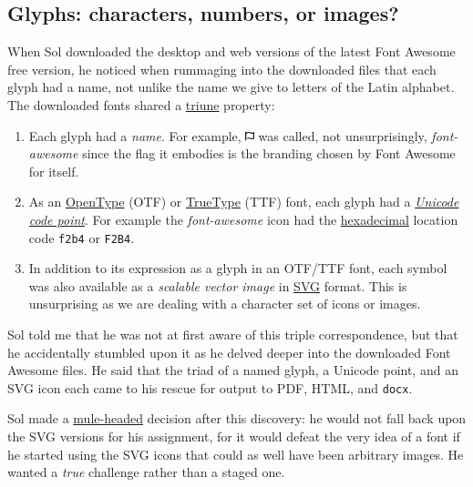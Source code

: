 \documentclass[
  british,
  a4paper,
  rgb,
  dvipsnames,
  svgnames,
  hyphens]{article}
\begin{document}
\hypertarget{glyphs-characters-numbers-or-images}{%
\subsection{Glyphs: characters, numbers, or
images?}\label{glyphs-characters-numbers-or-images}}

When Sol downloaded the desktop and web versions of the latest Font
Awesome free version, he noticed when rummaging into the downloaded
files that each glyph had a name, not unlike the name we give to letters
of the Latin alphabet. The downloaded fonts shared a
\href{https://www.collinsdictionary.com/dictionary/english/triune}{triune}
property:

\begin{enumerate}
\item
  Each glyph had a \emph{name}. For example,
  \includegraphics[width=0.02\textwidth,height=\textheight]{images/font-awesome.svg}
  was called, not unsurprisingly, \emph{font-awesome} since the flag it
  embodies is the branding chosen by Font Awesome for itself.
\item
  As an \href{https://en.wikipedia.org/wiki/OpenType}{OpenType} (OTF) or
  \href{https://en.wikipedia.org/wiki/TrueType}{TrueType} (TTF) font,
  each glyph had a
  \href{https://en.wikipedia.org/wiki/Code_point}{\emph{Unicode code
  point}}. For example the \emph{font-awesome} icon had the
  \href{https://en.wikipedia.org/wiki/Hexadecimal}{hexadecimal} location
  code \texttt{f2b4} or \texttt{F2B4}.
\item
  In addition to its expression as a glyph in an OTF/TTF font, each
  symbol was also available as a \emph{scalable vector image} in
  \href{https://developer.mozilla.org/en-US/docs/Web/SVG}{SVG} format.
  This is unsurprising as we are dealing with a character set of icons
  or images.
\end{enumerate}

Sol told me that he was not at first aware of this triple
correspondence, but that he accidentally stumbled upon it as he delved
deeper into the downloaded Font Awesome files. He said that the triad of
a named glyph, a Unicode point, and an SVG icon each came to his rescue
for output to PDF, HTML, and \texttt{docx}.

Sol made a
\href{https://www.lexico.com/definition/mule-headed}{mule-headed}
decision after this discovery: he would not fall back upon the SVG
versions for his assignment, for it would defeat the very idea of a font
if he started using the SVG icons that could as well have been arbitrary
images. He wanted a \emph{true} challenge rather than a staged one.
\end{document}
